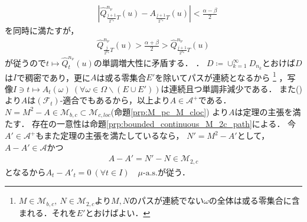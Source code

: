 \begin{prf}
\begin{description}
{\begin{align}
						\quad \left| \hat{Q}_{\frac{j+1}{2^{n_k}}T}^{n_\nu}(u) - A_{\frac{j+1}{2^{n_k}}T}(u) \right| < \frac{\alpha - \beta}{2}
					\end{align}
					を同時に満たすが，
					\begin{align}
						\hat{Q}_{\frac{j}{2^{n_k}}T}^{n_\nu}(u) > \frac{\alpha + \beta}{2} > \hat{Q}_{\frac{j+1}{2^{n_k}}T}^{n_\nu}(u)
					\end{align}
					が従うので$t \longmapsto \hat{Q}_t^{n_\nu}(u)$の単調増大性に矛盾する．
				}．
				$D \coloneqq \cup_{k=1}^{\infty} D_{n_k}$とおけば$D$は$I$で稠密であり，更に$A$は或る零集合$E'$を除いてパスが連続となるから
				\footnote{
					$M \in \mathcal{M}_{b,c},\ N \in \mathcal{M}_{2,c}$より$M,N$のパスが連続でない$\omega$の全体は或る零集合に含まれる．それを$E'$とおけばよい．
				}
				，写像$I \ni t \longmapsto A_t(\omega)\ (\forall \omega \in \Omega \backslash (E \cup E'))$は連続且つ単調非減少である．
				また()より$A$は$(\mathcal{F}_t)$-適合でもあるから，以上より$A \in \mathcal{A}^+$である．
				$N = M^2 - A \in \mathcal{M}_{b,c} \subset \mathcal{M}_{c,loc}$(命題\ref{prp:M_pc_M_cloc})
				より$A$は定理の主張を満たす．
				存在の一意性は命題\ref{prp:bounded_continuous_M_2c_path}による．
				今$A' \in \mathcal{A}^+$もまた定理の主張を満たしているなら，
				$N' = M^2 - A'$として，$A - A' \in \mathcal{A}$かつ
				\begin{align}
					A - A' = N' - N \in \mathcal{M}_{2,c}
				\end{align}
				となるから$A_t - A'_t = 0\ (\forall t \in I)\quad \mbox{$\mu$-a.s.}$が従う．
				

\end{description}
\end{prf}
